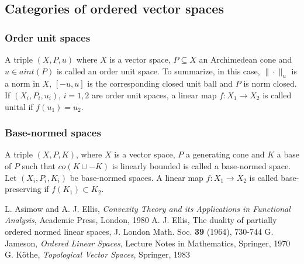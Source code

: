 \documentclass[12pt]{article}
\theoremstyle{remark}
\newcommand{\<}{\langle}
\begin{document}
\subsection{Categories of ordered vector spaces}
\subsubsection*{Order unit spaces}

A triple $(X,P,u)$ where $X$ is a vector space, $P\subseteq X$ an Archimedean  cone and $u\in aint(P)$ is called an order unit space. To summarize, in this case, 
$\|\cdot\|_u$ is a norm in $X$, $[-u,u]$ is the corresponding closed unit ball and $P$ is norm closed.
If $(X_i,P_i,u_i)$, $i=1,2$ are order unit spaces, a linear map $f:X_1\to X_2$ is called unital if $f(u_1)=u_2$.

\subsubsection*{Base-normed spaces}

A triple $(X,P,K)$, where $X$ is a vector space, $P$ a generating cone and $K$ a base of $P$ such that $co(K\cup-K)$ is linearly bounded is called a base-normed space. 
Let $(X_i,P_i,K_i)$ be base-normed spaces. A linear map $f:X_1\to X_2$ is called base-preserving if $f(K_1)\subset K_2$.

\begin{thebibliography}{99}
 L. Asimow and A. J. Ellis, \emph{ Convexity Theory and its Applications in Functional Analysis}, Academic Press, London, 1980
 A. J. Ellis, The duality of partially ordered normed linear spaces, J. London Math. Soc. \textbf{39} (1964), 730-744
G. Jameson, \emph{Ordered Linear Spaces}, Lecture Notes in Mathematics, Springer, 1970
 G. K\" othe, \emph{Topological Vector Spaces}, Springer, 1983
\end{thebibliography}
\end{document}
